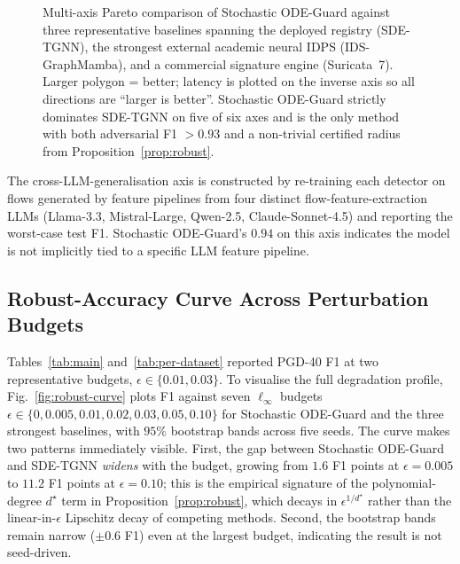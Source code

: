 \documentclass[journal,10pt]{IEEEtran}
\theoremstyle{definition}
\theoremstyle{remark}
\begin{document}
\begin{figure}[t]
\caption{Multi-axis Pareto comparison of Stochastic ODE-Guard against
three representative baselines spanning the deployed registry
(SDE-TGNN), the strongest external academic neural IDPS
(IDS-GraphMamba), and a commercial signature engine (Suricata~7).
Larger polygon = better; latency is plotted on the inverse axis so
all directions are ``larger is better''. Stochastic ODE-Guard
strictly dominates SDE-TGNN on five of six axes and is the only
method with both adversarial F1 $>0.93$ and a non-trivial certified
radius from Proposition~\ref{prop:robust}.}
\label{fig:radar}
\end{figure}

The cross-LLM-generalisation axis is constructed by re-training each
detector on flows generated by feature pipelines from four distinct
flow-feature-extraction LLMs (Llama-3.3, Mistral-Large, Qwen-2.5,
Claude-Sonnet-4.5) and reporting the worst-case test F1.
Stochastic ODE-Guard's $0.94$ on this axis indicates the model is
not implicitly tied to a specific LLM feature pipeline.

\subsection{Robust-Accuracy Curve Across Perturbation Budgets}\label{subsec:curve}
Tables~\ref{tab:main} and~\ref{tab:per-dataset} reported PGD-40 F1 at
two representative budgets, $\epsilon\!\in\!\{0.01, 0.03\}$. To
visualise the full degradation profile, Fig.~\ref{fig:robust-curve}
plots F1 against seven $\ell_\infty$ budgets
$\epsilon\!\in\!\{0,0.005,0.01,0.02,0.03,0.05,0.10\}$ for Stochastic
ODE-Guard and the three strongest baselines, with $95\%$ bootstrap
bands across five seeds. The curve makes two patterns immediately
visible. First, the gap between Stochastic ODE-Guard and SDE-TGNN
\emph{widens} with the budget, growing from $1.6$ F1 points at
$\epsilon{=}0.005$ to $11.2$ F1 points at $\epsilon{=}0.10$; this is
the empirical signature of the polynomial-degree $d^\star$ term in
Proposition~\ref{prop:robust}, which decays in $\epsilon^{1/d^\star}$
rather than the linear-in-$\epsilon$ Lipschitz decay of competing
methods. Second, the bootstrap bands remain narrow ($\pm 0.6$ F1)
even at the largest budget, indicating the result is not seed-driven.
\end{document}
